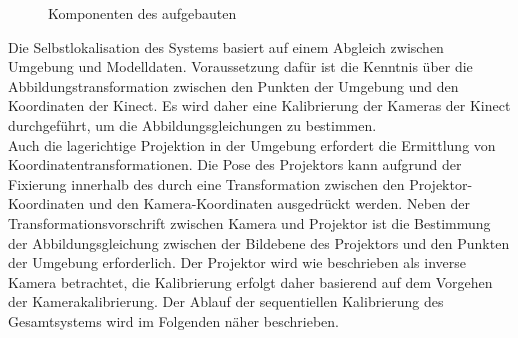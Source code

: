 \begin{figure}[ht]
	\begin{center}%
		\caption{Komponenten des aufgebauten }
		\label{fig.kinpro}
	\end{center}
\end{figure}

Die Selbstlokalisation des Systems basiert auf einem Abgleich zwischen Umgebung und Modelldaten. Voraussetzung dafür ist die Kenntnis über die Abbildungstransformation zwischen den Punkten der Umgebung und den Koordinaten der Kinect. Es wird daher eine Kalibrierung der Kameras der Kinect durchgeführt, um die Abbildungsgleichungen zu bestimmen.\\

Auch die lagerichtige Projektion in der Umgebung erfordert die Ermittlung von Koordinatentransformationen. Die Pose des Projektors kann aufgrund der Fixierung innerhalb des  durch eine Transformation zwischen den Projektor-Koordinaten und den Kamera-Koordinaten ausgedrückt werden. Neben der Transformationsvorschrift zwischen Kamera und Projektor ist die Bestimmung der Abbildungsgleichung zwischen der Bildebene des Projektors und den Punkten der Umgebung erforderlich. Der Projektor wird wie beschrieben als inverse Kamera betrachtet, die Kalibrierung erfolgt daher basierend auf dem Vorgehen der Kamerakalibrierung. Der Ablauf der sequentiellen Kalibrierung des Gesamtsystems wird im Folgenden näher beschrieben. 


